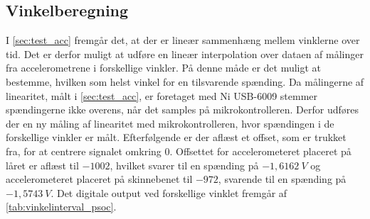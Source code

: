 \subsection{Vinkelberegning}\label{sec:imp_vinkler}
I \autoref{sec:test_acc} fremgår det, at der er lineær sammenhæng mellem vinklerne over tid. Det er derfor muligt at udføre en lineær interpolation over dataen af målinger fra accelerometrene i forskellige vinkler. På denne måde er det muligt at bestemme, hvilken som helst vinkel for en tilsvarende spænding. Da målingerne af linearitet, målt i \autoref{sec:test_acc}, er foretaget med Ni USB-6009 stemmer spændingerne ikke overens, når det samples på mikrokontrolleren. Derfor udføres der en ny måling af linearitet med mikrokontrolleren, hvor spændingen i de forskellige vinkler er målt. Efterfølgende er der aflæst et offset, som er trukket fra, for at centrere signalet omkring 0. Offsettet for accelerometeret placeret på låret er aflæst til $-1002$, hvilket svarer til en spænding på $-1,6162~V$ og accelerometeret placeret på skinnebenet til $-972$, svarende til en spænding på $-1,5743~V$. Det digitale output ved forskellige vinklet fremgår af \autoref{tab:vinkelinterval_psoc}.

